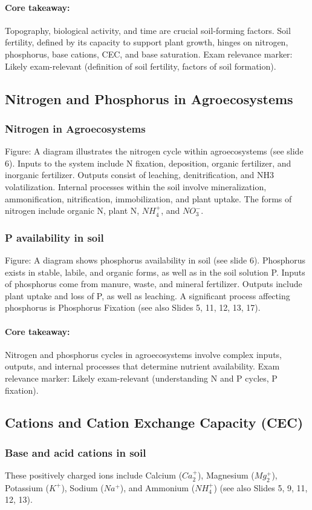 \paragraph*{Core takeaway:} 
Topography, biological activity, and time are crucial soil-forming factors. Soil fertility, defined by its capacity to support plant growth, hinges on nitrogen, phosphorus, base cations, CEC, and base saturation. Exam relevance marker: Likely exam-relevant (definition of soil fertility, factors of soil formation).

\subsection{Nitrogen and Phosphorus in Agroecosystems} \subsubsection{Nitrogen in Agroecosystems} 
Figure: A diagram illustrates the nitrogen cycle within agroecosystems (see slide 6). Inputs to the system include N fixation, deposition, organic fertilizer, and inorganic fertilizer. Outputs consist of leaching, denitrification, and NH3 volatilization. Internal processes within the soil involve mineralization, ammonification, nitrification, immobilization, and plant uptake. The forms of nitrogen include organic N, plant N, $NH_4^+$, and $NO_3^-$.

\subsubsection{P availability in soil} 
Figure: A diagram shows phosphorus availability in soil (see slide 6). Phosphorus exists in stable, labile, and organic forms, as well as in the soil solution P. Inputs of phosphorus come from manure, waste, and mineral fertilizer. Outputs include plant uptake and loss of P, as well as leaching. A significant process affecting phosphorus is Phosphorus Fixation (see also Slides 5, 11, 12, 13, 17).

\paragraph*{Core takeaway:} 
Nitrogen and phosphorus cycles in agroecosystems involve complex inputs, outputs, and internal processes that determine nutrient availability. Exam relevance marker: Likely exam-relevant (understanding N and P cycles, P fixation).

\subsection{Cations and Cation Exchange Capacity (CEC)} \subsubsection{Base and acid cations in soil} 
 These positively charged ions include Calcium ($Ca_2^+$), Magnesium ($Mg_2^+$), Potassium ($K^+$), Sodium ($Na^+$), and Ammonium ($NH_4^+$) (see also Slides 5, 9, 11, 12, 13).

